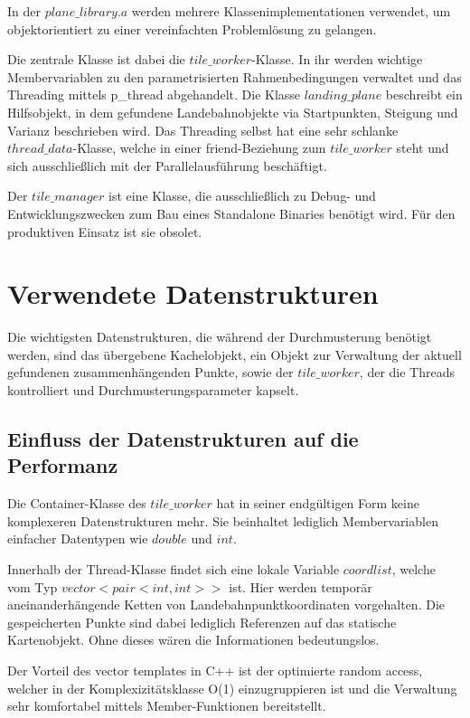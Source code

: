 \documentclass[10pt,a4paper]{report}
\begin{document}
In der $plane\_library.a$ werden mehrere Klassenimplementationen verwendet, um objektorientiert zu einer vereinfachten Problemlösung zu gelangen.

Die zentrale Klasse ist dabei die $tile\_worker$-Klasse. In ihr werden wichtige Membervariablen zu den parametrisierten Rahmenbedingungen verwaltet und das Threading mittels p\_thread abgehandelt. Die Klasse $landing\_plane$ beschreibt ein Hilfsobjekt, in dem gefundene Landebahnobjekte via Startpunkten, Steigung und Varianz beschrieben wird.
Das Threading selbst hat eine sehr schlanke $thread\_data$-Klasse, welche in einer \glqq friend\grqq -Beziehung zum $tile\_worker$ steht und sich ausschließlich mit der Parallelausführung beschäftigt.

Der $tile\_manager$ ist eine Klasse, die ausschließlich zu Debug- und Entwicklungszwecken zum Bau eines Standalone Binaries benötigt wird.
Für den produktiven Einsatz ist sie obsolet.


\section{Verwendete Datenstrukturen}

Die wichtigsten Datenstrukturen, die während der Durchmusterung benötigt werden, sind das übergebene Kachelobjekt, ein Objekt zur Verwaltung der aktuell gefundenen zusammenhängenden Punkte, sowie der $tile\_worker$, der die Threads kontrolliert und Durchmusterungsparameter kapselt. 

\subsection{Einfluss der Datenstrukturen auf die Performanz}

Die Container-Klasse des $tile\_worker$ hat in seiner endgültigen Form keine komplexeren Datenstrukturen mehr. Sie beinhaltet lediglich Membervariablen einfacher Datentypen wie $double$ und $int$.

Innerhalb der Thread-Klasse findet sich eine lokale Variable $coordlist$, welche vom Typ $vector< pair<int,int> >$ ist.
Hier werden temporär aneinanderhängende Ketten von Landebahnpunktkoordinaten vorgehalten. Die gespeicherten Punkte sind dabei lediglich Referenzen auf das statische Kartenobjekt. Ohne dieses wären die Informationen bedeutungslos.

Der Vorteil des vector templates in C++ ist der optimierte random access, welcher in der Komplexizitätsklasse O(1) einzugruppieren ist und die Verwaltung sehr komfortabel mittels Member-Funktionen bereitstellt.
\end{document}
